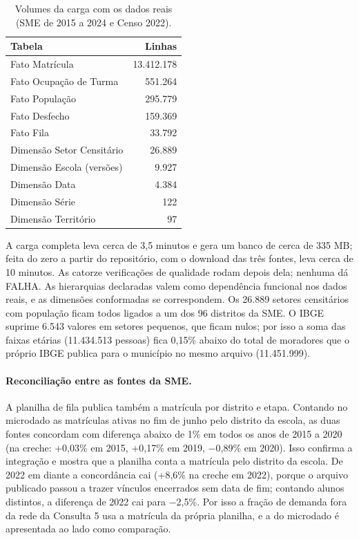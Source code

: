 \documentclass[11pt,a4paper]{article}
\begin{document}
\begin{table}[H]\centering\small
\begin{tabular}{lr}
\toprule\textbf{Tabela} & \textbf{Linhas}\\\midrule
Fato Matrícula & 13.412.178 \\
Fato Ocupação de Turma & 551.264 \\
Fato População & 295.779 \\
Fato Desfecho & 159.369 \\
Fato Fila & 33.792 \\
Dimensão Setor Censitário & 26.889 \\
Dimensão Escola (versões) & 9.927 \\
Dimensão Data & 4.384 \\
Dimensão Série & 122 \\
Dimensão Território & 97 \\
\bottomrule\end{tabular}
\caption{Volumes da carga com os dados reais (SME de 2015 a 2024 e Censo 2022).}
\end{table}

A carga completa leva cerca de 3,5 minutos e gera um banco de cerca de 335 MB; feita do zero a partir do repositório, com o download das três fontes, leva cerca de 10 minutos. As catorze verificações de qualidade rodam depois dela; nenhuma dá FALHA. As hierarquias declaradas valem como dependência funcional nos dados reais, e as dimensões conformadas se correspondem. Os 26.889 setores censitários com população ficam todos ligados a um dos 96 distritos da SME. O IBGE suprime 6.543 valores em setores pequenos, que ficam nulos; por isso a soma das faixas etárias (11.434.513 pessoas) fica 0,15\% abaixo do total de moradores que o próprio IBGE publica para o município no mesmo arquivo (11.451.999).

\paragraph{Reconciliação entre as fontes da SME.} A planilha de fila publica também a matrícula por distrito e etapa. Contando no microdado as matrículas ativas no fim de junho pelo distrito da escola, as duas fontes concordam com diferença abaixo de 1\% em todos os anos de 2015 a 2020 (na creche: +0,03\% em 2015, +0,17\% em 2019, $-$0,89\% em 2020). Isso confirma a integração e mostra que a planilha conta a matrícula pelo distrito da escola. De 2022 em diante a concordância cai (+8,6\% na creche em 2022), porque o arquivo publicado passou a trazer vínculos encerrados sem data de fim; contando alunos distintos, a diferença de 2022 cai para $-$2,5\%. Por isso a fração de demanda fora da rede da Consulta 5 usa a matrícula da própria planilha, e a do microdado é apresentada ao lado como comparação.
\end{document}

